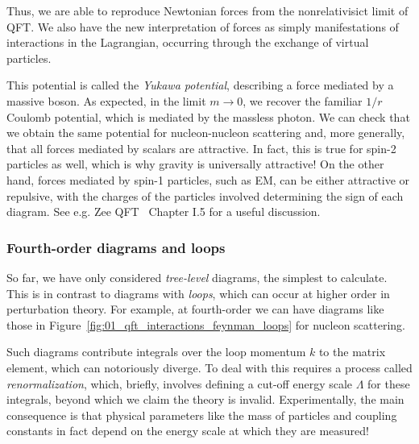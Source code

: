 Thus, we are able to reproduce Newtonian forces from the nonrelativisict limit of QFT.
We also have the new interpretation of forces as simply manifestations of interactions in the Lagrangian, occurring through the exchange of virtual particles.

This potential is called the \textit{Yukawa potential}, describing a force mediated by a massive boson.
As expected, in the limit $m \rightarrow 0$, we recover the familiar $1/r$ Coulomb potential, which is mediated by the massless photon.
We can check that we obtain the same potential for nucleon-nucleon scattering and, more generally, that all forces mediated by scalars are attractive.
In fact, this is true for spin-2 particles as well, which is why gravity is universally attractive!
On the other hand, forces mediated by spin-1 particles, such as EM, can be either attractive or repulsive, with the charges of the particles involved determining the sign of each diagram.
See e.g. Zee QFT~\cite{Zee:2003mt} Chapter I.5 for a useful discussion.

\subsubsection{Fourth-order diagrams and loops}

So far, we have only considered \textit{tree-level} diagrams, the simplest to calculate.
This is in contrast to diagrams with \textit{loops}, which can occur at higher order in perturbation theory.
For example, at fourth-order we can have diagrams like those in Figure~\ref{fig:01_qft_interactions_feynman_loops} for nucleon scattering.

Such diagrams contribute integrals over the loop momentum $k$ to the matrix element, which can notoriously diverge.
To deal with this requires a process called \textit{renormalization}, which, briefly, involves defining a cut-off energy scale $\Lambda$ for these integrals, beyond which we claim the theory is invalid.
Experimentally, the main consequence is that physical parameters like the mass of particles and coupling constants in fact depend on the energy scale at which they are measured!

